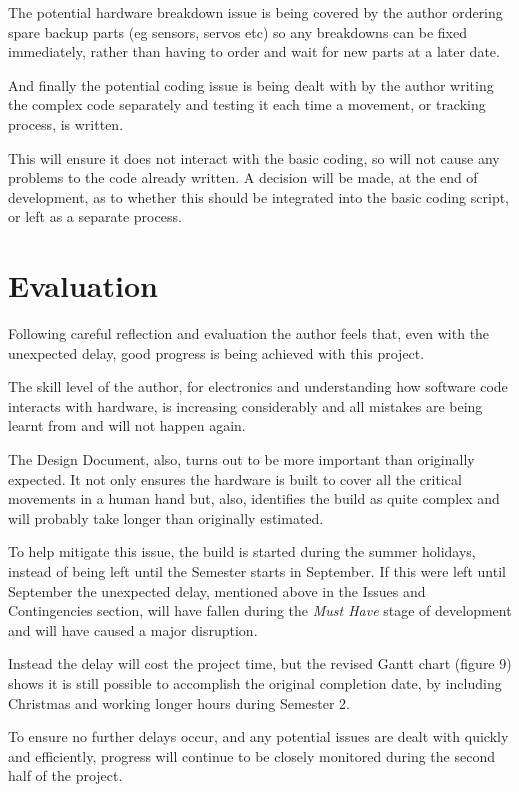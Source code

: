 \documentclass[progress]{cmpreport}
\begin{document}
The potential hardware breakdown issue is being covered by the author ordering spare backup parts (eg sensors, servos etc) so any breakdowns can be fixed immediately, rather than having to order and wait for new parts at a later date.

And finally the potential coding issue is being dealt with by the author writing the complex code separately and testing it each time a movement, or tracking process, is written. 

This will ensure it does not interact with the basic coding, so will not cause any problems to the code already written. A decision will be made, at the end of development, as to whether this should be integrated into the basic coding script, or left as a separate process.


\section{Evaluation}
Following careful reflection and evaluation the author feels that, even with the unexpected delay, good progress is being achieved with this project. 

The skill level of the author, for electronics and understanding how software code interacts with hardware, is increasing considerably and all mistakes are being learnt from and will not happen again.

The Design Document, also, turns out to be more important than originally expected. It not only ensures the hardware is built to cover all the critical movements in a human hand but, also, identifies the build as quite complex and will probably take longer than originally estimated. 

To help mitigate this issue, the build is started during the summer holidays, instead of being left until the Semester starts in September. If this were left until September the unexpected delay, mentioned above in the Issues and Contingencies section, will have fallen during the \textit{Must Have} stage of development and will have caused a major disruption.

Instead the delay will cost the project time, but the revised Gantt chart (figure 9) shows it is still possible to accomplish the original completion date, by including Christmas and working longer hours during Semester 2.

To ensure no further delays occur, and any potential issues are dealt with quickly and efficiently, progress will continue to be closely monitored during the second half of the project. 
\end{document}
